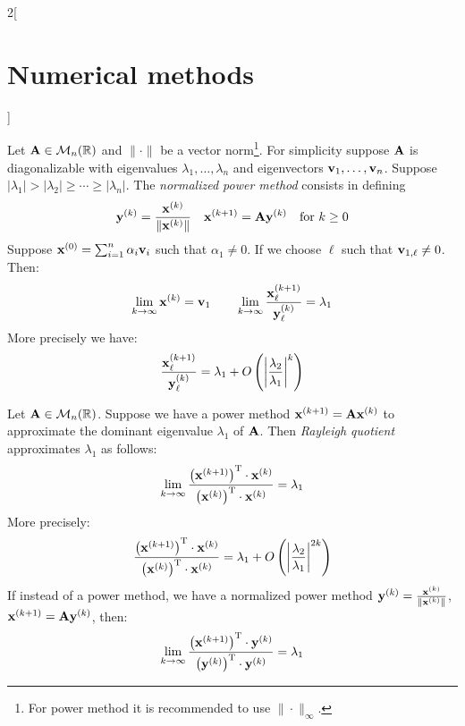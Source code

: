 \documentclass[../../../main.tex]{subfiles}
\begin{document}
\begin{multicols}{2}[\section{Numerical methods}]
\begin{method}
  \end{method}
  \begin{method}
    Let $\boldsymbol{\mathrm{A}}\in\mathcal{M}_n(\mathbb{R})$ and $\|\cdot\|$ be a vector norm\footnote{For power method it is recommended to use $\|\cdot\|_\infty$.}. For simplicity suppose $\boldsymbol{\mathrm{A}}$ is diagonalizable with eigenvalues $\lambda_1,\ldots,\lambda_n$ and eigenvectors $\boldsymbol{\mathrm{v}}_1,\ldots,\boldsymbol{\mathrm{v}}_n$. Suppose $|\lambda_1|>|\lambda_2|\geq\cdots\geq|\lambda_n|$. The \emph{normalized power method} consists in defining $$\boldsymbol{\mathrm{y}}^{(k)}=\frac{\boldsymbol{\mathrm{x}}^{(k)}}{\|\boldsymbol{\mathrm{x}}^{(k)}\|}\quad\boldsymbol{\mathrm{x}}^{(k+1)}=\boldsymbol{\mathrm{A}}\boldsymbol{\mathrm{y}}^{(k)}\quad\text{for }k\geq 0$$ Suppose $\boldsymbol{\mathrm{x}}^{(0)}=\sum_{i=1}^n\alpha_i\boldsymbol{\mathrm{v}}_i$ such that $\alpha_1\ne0$. If we choose $\ell$ such that $\boldsymbol{\mathrm{v}}_{1,\ell}\ne0$. Then: $$\lim_{k\to\infty}\boldsymbol{\mathrm{x}}^{(k)}=\boldsymbol{\mathrm{v}}_1\qquad\lim_{k\to\infty}\frac{\boldsymbol{\mathrm{x}}_\ell^{(k+1)}}{\boldsymbol{\mathrm{y}}_\ell^{(k)}}=\lambda_1$$ More precisely we have: $$\frac{\boldsymbol{\mathrm{x}}_\ell^{(k+1)}}{\boldsymbol{\mathrm{y}}_\ell^{(k)}}=\lambda_1+O\left(\left|\frac{\lambda_2}{\lambda_1}\right|^k\right)$$
  \end{method}
  \begin{method}
    Let $\boldsymbol{\mathrm{A}}\in\mathcal{M}_n(\mathbb{R})$. Suppose we have a power method $\boldsymbol{\mathrm{x}}^{(k+1)}=\boldsymbol{\mathrm{A}}\boldsymbol{\mathrm{x}}^{(k)}$ to approximate the dominant eigenvalue $\lambda_1$ of $\boldsymbol{\mathrm{A}}$. Then \emph{Rayleigh quotient} approximates $\lambda_1$ as follows: $$\lim_{k\to\infty}\frac{\left(\boldsymbol{\mathrm{x}}^{(k+1)}\right)^\mathrm{T}\cdot \boldsymbol{\mathrm{x}}^{(k)}}{\left(\boldsymbol{\mathrm{x}}^{(k)}\right)^\mathrm{T}\cdot\boldsymbol{\mathrm{x}}^{(k)}}=\lambda_1$$
    More precisely: $$\frac{\left(\boldsymbol{\mathrm{x}}^{(k+1)}\right)^\mathrm{T}\cdot \boldsymbol{\mathrm{x}}^{(k)}}{\left(\boldsymbol{\mathrm{x}}^{(k)}\right)^\mathrm{T}\cdot\boldsymbol{\mathrm{x}}^{(k)}}=\lambda_1+O\left(\left|\frac{\lambda_2}{\lambda_1}\right|^{2k}\right)$$ If instead of a power method, we have a normalized power method $\boldsymbol{\mathrm{y}}^{(k)}=\frac{\boldsymbol{\mathrm{x}}^{(k)}}{\|\boldsymbol{\mathrm{x}}^{(k)}\|}$, $\boldsymbol{\mathrm{x}}^{(k+1)}=\boldsymbol{\mathrm{A}}\boldsymbol{\mathrm{y}}^{(k)}$, then: $$\lim_{k\to\infty}\frac{\left(\boldsymbol{\mathrm{x}}^{(k+1)}\right)^\mathrm{T}\cdot \boldsymbol{\mathrm{y}}^{(k)}}{\left(\boldsymbol{\mathrm{y}}^{(k)}\right)^\mathrm{T}\cdot\boldsymbol{\mathrm{y}}^{(k)}}=\lambda_1$$
  \end{method}
  \begin{method}

\end{method}
\end{multicols}
\end{document}
